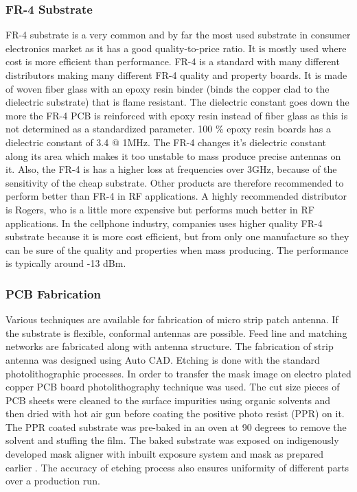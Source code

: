 \documentclass[12pt]{article}
\begin{document}
	             \subsubsection{FR-4 Substrate}
		           \justify
		            FR-4 substrate is a very common and by far the most used substrate in consumer electronics market as it has a good quality-to-price ratio. It is mostly used where cost is more efficient than performance. FR-4 is a standard with many different distributors making many different FR-4 quality and property boards. It is made of woven fiber glass with an epoxy resin binder (binds the copper clad to the dielectric substrate) that is flame resistant.
		           \justify
		            The dielectric constant goes down the more the FR-4 PCB is reinforced with epoxy resin instead of fiber glass as this is not determined as a standardized parameter. 100 \% epoxy resin boards has a dielectric constant of 3.4 @ 1MHz.
		           \justify
		           	The FR-4 changes it’s dielectric constant along its area which makes it too unstable to mass produce precise antennas on it. Also, the FR-4 is has a higher loss at frequencies over 3GHz, because of the sensitivity of the cheap substrate. Other products are therefore recommended to perform better than FR-4 in RF applications. A highly recommended distributor is Rogers, who is a little more expensive but performs much better in RF applications. In the cellphone industry, companies uses higher quality FR-4 substrate because it is more cost efficient, but from only one manufacture so they can be sure of the quality and properties when mass producing. The performance is typically around -13 dBm.
		        
		        \subsubsection{PCB Fabrication}
		         \justify
		          Various techniques are available for fabrication of micro strip patch antenna. If the substrate is flexible, conformal antennas are possible. Feed line and matching networks are fabricated along with antenna structure. The fabrication of strip antenna was designed using Auto CAD. Etching is done with the standard photolithographic processes. In order to transfer the mask image on electro plated copper PCB board photolithography technique was used. The cut size pieces of PCB sheets were cleaned to the surface impurities using organic solvents and then dried with hot air gun before coating the positive photo resist (PPR) on it. The PPR coated substrate was pre-baked in an oven at 90 degrees to remove the solvent and stuffing the film. The baked substrate was exposed on indigenously developed mask aligner with inbuilt exposure system and mask as prepared earlier . The accuracy of etching process also ensures uniformity of different parts over a production run.
\end{document}
